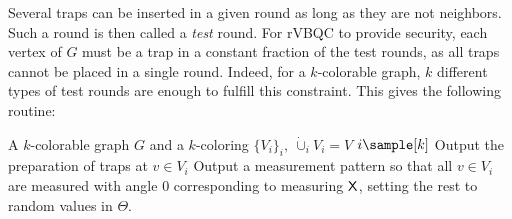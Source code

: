 Several traps can be inserted in a given round as long as they are not neighbors. Such a round is then called a \emph{test} round. For rVBQC to provide security, each vertex of \(G\) must be a trap in a constant fraction of the test rounds, as all traps cannot be placed in a single round. Indeed, for a \(k\)-colorable graph, \(k\) different types of test rounds are enough to fulfill this constraint. This gives the following routine:
\begin{routine}
  \label{routine:test-sampling}
  \item
  \begin{algorithmic}[0]
    \State A \(k\)-colorable graph \(G\) and a \(k\)-coloring \(\{V_i\}_i, \ \dot{\cup}_i V_i = V\)
    \State \(i \sample [k]\)
    \State Output the preparation of traps at \(v \in V_i\)
    \State Output a measurement pattern so that all \(v \in V_i\) are measured with angle 0 corresponding to measuring \(\mathsf{X}\), setting the rest to random values in \(\Theta\).
    \EndProcedure
  \end{algorithmic}
\end{routine}





